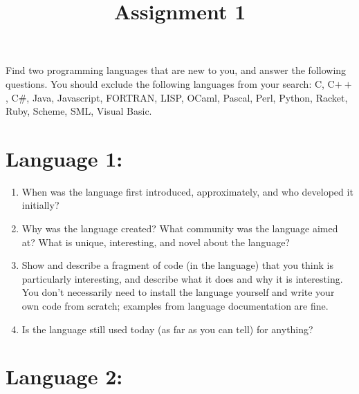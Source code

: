 \documentclass{article}
\title{\vspace*{-10em}Assignment 1}
\date{}
\begin{document}
\maketitle
\vspace*{-3em}

Find two programming languages that are new to you, and answer the
following questions.  You should exclude the following languages from
your search: C, C$++$, C\#, Java, Javascript, FORTRAN, LISP, OCaml,
Pascal, Perl, Python, Racket, Ruby, Scheme, SML, Visual Basic.

\section{Language 1:}

\begin{enumerate}
\item When was the language first introduced, approximately, and who developed it initially?

\vspace*{5em}

\item Why was the language created? What community was the language aimed at? What is unique, interesting, and novel about the language?

  \vspace*{5em}

  \item Show and describe a fragment of code (in the language) that you think is particularly interesting, and describe what it does and why it is interesting. You don’t necessarily need to install the language yourself and write your own code from scratch; examples from language documentation are fine.

  \vspace*{30em}
    
  \item Is the language still used today (as far as you can tell) for anything?

    \clearpage
  
\end{enumerate}

\section{Language 2:}
\end{document}
